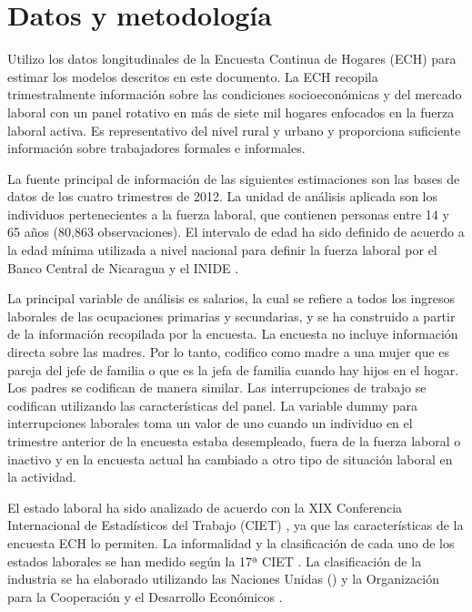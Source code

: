 \section{Datos y metodología}
Utilizo los datos longitudinales de la Encuesta Continua de Hogares (ECH) para estimar los modelos descritos en este documento. La ECH recopila trimestralmente información sobre las condiciones socioeconómicas y del mercado laboral con un panel rotativo en más de siete mil hogares enfocados en la fuerza laboral activa. Es representativo del nivel rural y urbano y proporciona suficiente información sobre trabajadores formales e informales.

La fuente principal de información de las siguientes estimaciones son las bases de datos de los cuatro trimestres de 2012. La unidad de análisis aplicada son los individuos pertenecientes a la fuerza laboral, que contienen personas entre 14 y 65 años (80,863 observaciones). El intervalo de edad ha sido definido de acuerdo a la edad mínima utilizada a nivel nacional para definir la fuerza laboral por el Banco Central de Nicaragua y el INIDE \citep{BCN2009}.

La principal variable de análisis es salarios, la cual se refiere a todos los ingresos laborales de las ocupaciones primarias y secundarias, y se ha construido a partir de la información recopilada por la encuesta. La encuesta no incluye información directa sobre las madres. Por lo tanto, codifico como madre a una mujer que es pareja del jefe de familia o que es la jefa de familia cuando hay hijos en el hogar. Los padres se codifican de manera similar. Las interrupciones de trabajo se codifican utilizando las características del panel. La variable dummy para interrupciones laborales toma un valor de uno cuando un individuo en el trimestre anterior de la encuesta estaba desempleado, fuera de la fuerza laboral o inactivo y en la encuesta actual ha cambiado a otro tipo de situación laboral en la actividad.

El estado laboral ha sido analizado de acuerdo con la XIX Conferencia Internacional de Estadísticos del Trabajo (CIET) \citep{ILO2013}, ya que las características de la encuesta ECH lo permiten. La informalidad y la clasificación de cada uno de los estados laborales se han medido según la 17ª CIET \citep{ILO2013}. La clasificación de la industria se ha elaborado utilizando las Naciones Unidas (\citeyear{Nations2008}) y la Organización para la Cooperación y el Desarrollo Económicos \citep{OECD1997}.

